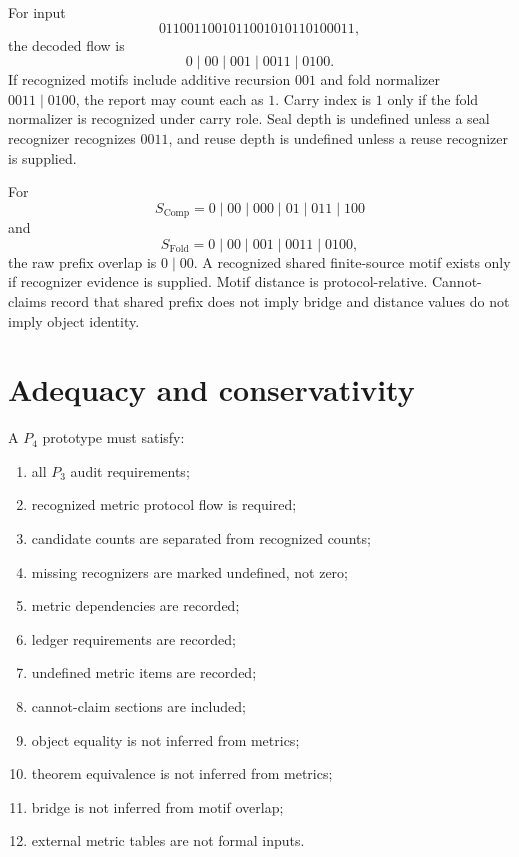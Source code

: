\begin{example}
\label{ex:metric-report-fold}
For input
$$
  0110011001011001010110100011,
$$
the decoded flow is
$$
  0\mid 00\mid 001\mid 0011\mid 0100.
$$
If recognized motifs include additive recursion $001$ and fold normalizer $0011\mid 0100$, the report may count each as $1$. Carry index is $1$ only if the fold normalizer is recognized under carry role. Seal depth is undefined unless a seal recognizer recognizes $0011$, and reuse depth is undefined unless a reuse recognizer is supplied.
\end{example}

\begin{example}
\label{ex:metric-report-completion-fold-comparison}
For
$$
  S_{\mathrm{Comp}}=0\mid 00\mid 000\mid 01\mid 011\mid 100
$$
and
$$
  S_{\mathrm{Fold}}=0\mid 00\mid 001\mid 0011\mid 0100,
$$
the raw prefix overlap is $0\mid 00$. A recognized shared finite-source motif exists only if recognizer evidence is supplied. Motif distance is protocol-relative. Cannot-claims record that shared prefix does not imply bridge and distance values do not imply object identity.
\end{example}

\section{Adequacy and conservativity}
\label{sec:metric-report-adequacy-conservativity}

\begin{definition}
\label{def:metric-report-p4-audit}
A $P_4$ prototype must satisfy:
\begin{enumerate}
\item all $P_3$ audit requirements;
\item recognized metric protocol flow is required;
\item candidate counts are separated from recognized counts;
\item missing recognizers are marked undefined, not zero;
\item metric dependencies are recorded;
\item ledger requirements are recorded;
\item undefined metric items are recorded;
\item cannot-claim sections are included;
\item object equality is not inferred from metrics;
\item theorem equivalence is not inferred from metrics;
\item bridge is not inferred from motif overlap;
\item external metric tables are not formal inputs.
\end{enumerate}
\end{definition}

